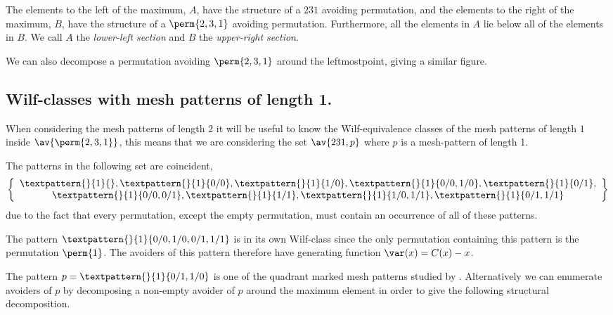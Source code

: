 The elements to the left of the maximum, \(A\), have the structure of a \(231\)
avoiding permutation, and the elements to the right of the maximum, \(B\), have
the structure of a \(\perm{2,3,1}\) avoiding permutation. Furthermore, all the
elements in \(A\) lie below all of the elements in \(B\). We call \(A\) the
\emph{lower-left section} and \(B\) the \emph{upper-right section}.

We can also decompose a permutation avoiding \(\perm{2,3,1}\) around the
leftmostpoint, giving a similar figure.

\subsection{Wilf-classes with mesh patterns of length 1.}
When considering the mesh patterns of length \(2\) it will be useful to know
the Wilf-equivalence classes of the mesh patterns of length \(1\) inside
\(\av{\perm{2,3,1}}\), this means that we are considering the set
\(\av{231,p}\)
where \(p\) is a mesh-pattern of length 1.

The patterns in the following set are coincident,
\begin{equation*}
    \left\{
        \begin{array}{c}
        \textpattern{}{1}{},
        \textpattern{}{1}{0/0},
        \textpattern{}{1}{1/0},
        \textpattern{}{1}{0/0,1/0},
        \textpattern{}{1}{0/1},\\
        \textpattern{}{1}{0/0,0/1},
        \textpattern{}{1}{1/1},
        \textpattern{}{1}{1/0,1/1},
        \textpattern{}{1}{0/1,1/1}
    \end{array}
    \right\}
\end{equation*}
due to the fact that every permutation, except the empty
permutation, must contain an occurrence of all of these patterns.

The pattern \(\textpattern{}{1}{0/0,1/0,0/1,1/1}\) is in its own
Wilf-class since the only permutation containing this pattern is
the permutation \(\perm{1}\). The avoiders of this pattern therefore
have generating function \(\var(x) = C(x)-x\).

\nextvar
The pattern \(p = \textpattern{}{1}{0/1,1/0}\) is one of the
quadrant marked mesh patterns studied by \textcite{2012arXiv1201.6243K}.
Alternatively we can enumerate
avoiders of \(p\) by decomposing a non-empty avoider of \(p\) around the
maximum element
in order to give the following structural decomposition.

